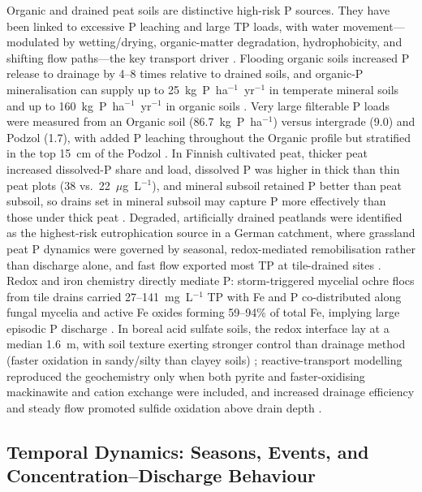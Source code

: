 Organic and drained peat soils are distinctive high-risk P sources. They have been linked
to excessive P leaching and large TP loads, with water movement---modulated by
wetting/drying, organic-matter degradation, hydrophobicity, and shifting flow paths---the
key transport driver \parencite{Grenon2021}. Flooding organic soils increased P release to
drainage by 4--8 times relative to drained soils, and organic-P mineralisation can supply
up to 25~kg~P~ha$^{-1}$~yr$^{-1}$ in temperate mineral soils and up to
160~kg~P~ha$^{-1}$~yr$^{-1}$ in organic soils \parencite{Sharpley1995}. Very large filterable
P loads were measured from an Organic soil (86.7~kg~P~ha$^{-1}$) versus intergrade (9.0) and
Podzol (1.7), with added P leaching throughout the Organic profile but stratified in the top
15~cm of the Podzol \parencite{McDowell2015b}. In Finnish cultivated peat, thicker peat
increased dissolved-P share and load, dissolved P was higher in thick than thin peat plots
(38 vs.\ 22~$\mu$g~L$^{-1}$), and mineral subsoil retained P better than peat subsoil, so
drains set in mineral subsoil may capture P more effectively than those under thick peat
\parencite{YliHalla2022,Pham2023,Höyhtyä2025}. Degraded, artificially drained peatlands were
identified as the highest-risk eutrophication source in a German catchment, where grassland
peat P dynamics were governed by seasonal, redox-mediated remobilisation rather than
discharge alone, and fast flow exported most TP at tile-drained sites
\parencite{Tiemeyer2009}. Redox and iron chemistry directly mediate P: storm-triggered
mycelial ochre flocs from tile drains carried 27--141~mg~L$^{-1}$ TP with Fe and P
co-distributed along fungal mycelia and active Fe oxides forming 59--94\% of total Fe,
implying large episodic P discharge \parencite{Zimmer2016}. In boreal acid sulfate soils,
the redox interface lay at a median 1.6~m, with soil texture exerting stronger control than
drainage method (faster oxidation in sandy/silty than clayey soils)
\parencite{Virtanen2017}; reactive-transport modelling reproduced the geochemistry only when
both pyrite and faster-oxidising mackinawite and cation exchange were included, and increased
drainage efficiency and steady flow promoted sulfide oxidation above drain depth
\parencite{Salo2023}.

\subsection{Temporal Dynamics: Seasons, Events, and Concentration--Discharge Behaviour}

